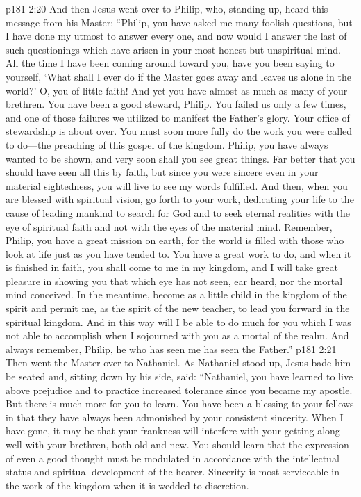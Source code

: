 \pc \vs p181 2:20 And then Jesus went over to Philip, who, standing up, heard this message from his Master: \textcolor{ubdarkred}{“Philip, you have asked me many foolish questions, but I have done my utmost to answer every one, and now would I answer the last of such questionings which have arisen in your most honest but unspiritual mind. All the time I have been coming around toward you, have you been saying to yourself, ‘What shall I ever do if the Master goes away and leaves us alone in the world?’ O, you of little faith! And yet you have almost as much as many of your brethren. You have been a good steward, Philip. You failed us only a few times, and one of those failures we utilized to manifest the Father’s glory. Your office of stewardship is about over. You must soon more fully do the work you were called to do---the preaching of this gospel of the kingdom. Philip, you have always wanted to be shown, and very soon shall you see great things. Far better that you should have seen all this by faith, but since you were sincere even in your material sightedness, you will live to see my words fulfilled. And then, when you are blessed with spiritual vision, go forth to your work, dedicating your life to the cause of leading mankind to search for God and to seek eternal realities with the eye of spiritual faith and not with the eyes of the material mind. Remember, Philip, you have a great mission on earth, for the world is filled with those who look at life just as you have tended to. You have a great work to do, and when it is finished in faith, you shall come to me in my kingdom, and I will take great pleasure in showing you that which eye has not seen, ear heard, nor the mortal mind conceived. In the meantime, become as a little child in the kingdom of the spirit and permit me, as the spirit of the new teacher, to lead you forward in the spiritual kingdom. And in this way will I be able to do much for you which I was not able to accomplish when I sojourned with you as a mortal of the realm. And always remember, Philip, he who has seen me has seen the Father.”}
\pc \vs p181 2:21 Then went the Master over to Nathaniel. As Nathaniel stood up, Jesus bade him be seated and, sitting down by his side, said: \textcolor{ubdarkred}{“Nathaniel, you have learned to live above prejudice and to practice increased tolerance since you became my apostle. But there is much more for you to learn. You have been a blessing to your fellows in that they have always been admonished by your consistent sincerity. When I have gone, it may be that your frankness will interfere with your getting along well with your brethren, both old and new. You should learn that the expression of even a good thought must be modulated in accordance with the intellectual status and spiritual development of the hearer. Sincerity is most serviceable in the work of the kingdom when it is wedded to discretion.}
